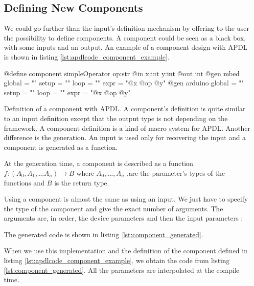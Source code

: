 \subsection{Defining New Components}
\label{sec:defining_component}

We could go further than the input's definition mechanism by offering to the
user the possibility to define components. A component could be seen as a
black box, with some inputs and an output. An example of a component design with
\gls{APDL} is shown in listing \ref{lst:apdlcode_component_example}.

\begin{listing}[H]
  \centering
\begin{apdlcode}
@define component simpleOperator op:str {
    @in x:int y:int
    @out int
    @gen mbed {
        global = ""
        setup = ""
        loop = ""
        expr = "@x @op @y"
    }
    @gen arduino {
        global = ""
        setup = ""
        loop = ""
        expr = "@x @op @y"
    }
}
\end{apdlcode}
  \caption[Definition of a component with \gls{APDL}]{Definition of a component
with \gls{APDL}. A component's definition is quite similar to an input
definition except that the output type is not depending on the framework. A
component definition is a kind of macro system for \gls{APDL}. Another
difference is the generation. An input is used only for recovering the input and
a component is generated as a function.}
  \label{lst:apdlcode_component_example}
\end{listing}

At the generation time, a component is described as a function $f :
(A_0,A_1,...A_n) \rightarrow B$ where $A_0,...,A_n$ ,are the parameter's types of
the functions and $B$ is the return type.

Using a component is almost the same as using an input. We just have to
specify the type of the component and give the exact number of arguments.
The arguments are, in order, the device parameters and then the input parameters :


The generated code is shown in listing \ref{lst:component_generated}.

When we use this implementation and the definition of the component defined in
listing \ref{lst:apdlcode_component_example}, we obtain the code from listing
\ref{lst:component_generated}. All the parameters are interpolated at the
compile time.

